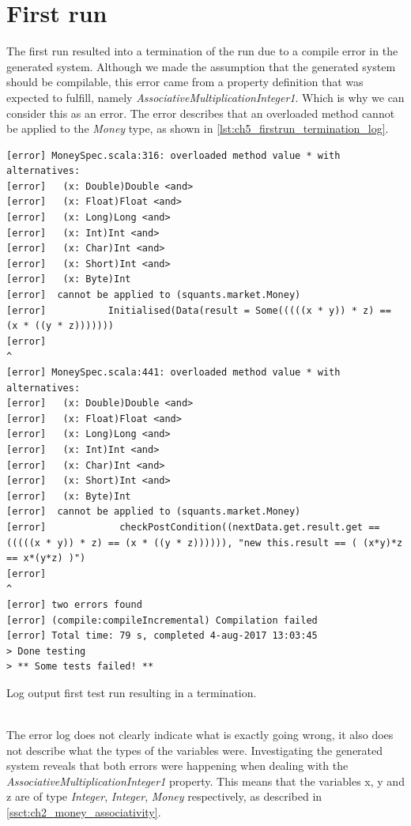\section{First run}
The first run resulted into a termination of the run due to a compile error in the generated system. Although we made the assumption that the generated system should be compilable, this error came from a property definition that was expected to fulfill, namely \textit{AssociativeMultiplicationInteger1}. Which is why we can consider this as an error. The error describes that an overloaded method cannot be applied to the \textit{Money} type, as shown in \autoref{lst:ch5_firstrun_termination_log}.
\\
\begin{sourcecode}[h!]
\begin{lstlisting}[language=Log]
[error] MoneySpec.scala:316: overloaded method value * with alternatives:
[error]   (x: Double)Double <and>
[error]   (x: Float)Float <and>
[error]   (x: Long)Long <and>
[error]   (x: Int)Int <and>
[error]   (x: Char)Int <and>
[error]   (x: Short)Int <and>
[error]   (x: Byte)Int
[error]  cannot be applied to (squants.market.Money)
[error]           Initialised(Data(result = Some(((((x * y)) * z) == (x * ((y * z)))))))
[error]                                                                 ^
[error] MoneySpec.scala:441: overloaded method value * with alternatives:
[error]   (x: Double)Double <and>
[error]   (x: Float)Float <and>
[error]   (x: Long)Long <and>
[error]   (x: Int)Int <and>
[error]   (x: Char)Int <and>
[error]   (x: Short)Int <and>
[error]   (x: Byte)Int
[error]  cannot be applied to (squants.market.Money)
[error]             checkPostCondition((nextData.get.result.get == (((((x * y)) * z) == (x * ((y * z)))))), "new this.result == ( (x*y)*z == x*(y*z) )")
[error]                                                                                    ^
[error] two errors found
[error] (compile:compileIncremental) Compilation failed
[error] Total time: 79 s, completed 4-aug-2017 13:03:45
> Done testing
> ** Some tests failed! **
\end{lstlisting}
\caption{Log output first test run resulting in a termination.}
\label{lst:ch5_firstrun_termination_log}
\end{sourcecode}
\\
The error log does not clearly indicate what is exactly going wrong, it also does not describe what the types of the variables were. Investigating the generated system reveals that both errors were happening when dealing with the \textit{AssociativeMultiplicationInteger1} property. This means that the variables x, y and z are of type \textit{Integer}, \textit{Integer}, \textit{Money} respectively, as described in \autoref{ssct:ch2_money_associativity}.\\
